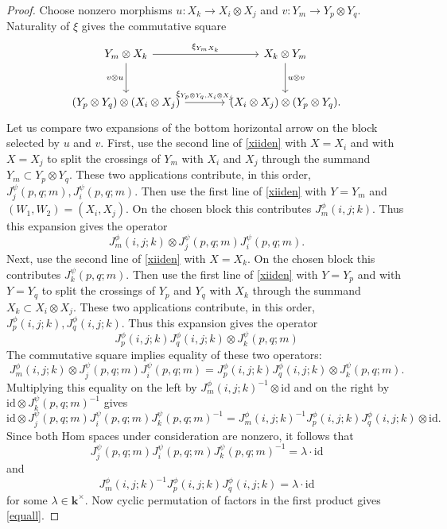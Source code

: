\documentclass[12pt]{amsart}
\numberwithin{equation}{section}
\theoremstyle{definition}
\newcommand{\id}{\text{id}}
\newcommand{\1}{_{(1)}}
\newcommand{\2}{_{(2)}}
\newcommand{\3}{_{(3)}}
\newcommand{\4}{_{(4)}}
\newcommand{\5}{_{(5)}}
\newcommand{\6}{_{(6)}}
\theoremstyle{plain}
\theoremstyle{definition}
\theoremstyle{remark}
\def\k{\mathbf{k}}
\begin{document}
\begin{proof}
Choose nonzero morphisms $u:X_k\to X_i\otimes X_j$ and $v:Y_m\to Y_p\otimes Y_q$.  Naturality of $\xi$ gives the commutative square
\[
\begin{tikzcd}[column sep=large,row sep=large]
Y_m\otimes X_k \arrow[r,"{\xi_{Y_mX_k}}"] \arrow[d,"{v\otimes u}"'] & X_k\otimes Y_m \arrow[d,"{u\otimes v}"] \\
(Y_p\otimes Y_q)\otimes (X_i\otimes X_j) \arrow[r,"{\xi_{Y_p\otimes Y_q, X_i\otimes X_j}}"] & (X_i\otimes X_j)\otimes (Y_p\otimes Y_q).
\end{tikzcd}
\]
Let us compare two expansions of the bottom horizontal arrow on the block selected by $u$ and $v$.
First, use the second line of \eqref{xiiden} with $X=X_i$ and with $X=X_j$ to split the crossings of $Y_m$ with $X_i$ and $X_j$ through the summand $Y_m\subset Y_p\otimes Y_q$.  These two applications contribute, in this order, $J^\psi_j(p,q;m), J^\psi_i(p,q;m)$. Then use the first line of \eqref{xiiden} with $Y=Y_m$ and $(W_1,W_2)=(X_i,X_j)$.  On the chosen block this contributes $J^\phi_m(i,j;k)$. 
Thus this expansion gives the operator
\[
        J^\phi_m(i,j;k)\otimes J^\psi_j(p,q;m)J^\psi_i(p,q;m).
\]
Next, use the second line of \eqref{xiiden} with $X=X_k$.  On the chosen block this contributes $J^\psi_k(p,q;m)$.  Then use the first line of \eqref{xiiden} with $Y=Y_p$ and with $Y=Y_q$ to split the crossings of $Y_p$ and $Y_q$ with $X_k$ through the summand $X_k\subset X_i\otimes X_j$.  These two applications contribute, in this order,
$J^\phi_p(i,j;k), J^\phi_q(i,j;k)$. Thus this expansion gives the operator
$$
        J^\phi_p(i,j;k)J^\phi_q(i,j;k)\otimes J^\psi_k(p,q;m)
$$
The commutative square implies equality of these two operators:
\[
        J^\phi_m(i,j;k)\otimes J^\psi_j(p,q;m)J^\psi_i(p,q;m)
        =
        J^\phi_p(i,j;k)J^\phi_q(i,j;k)\otimes J^\psi_k(p,q;m).
\]
Multiplying this equality on the left by $J^\phi_m(i,j;k)^{-1}\otimes\id$ and on the right by $\id\otimes J^\psi_k(p,q;m)^{-1}$ gives \scriptsize
$$
        \id\otimes J^\psi_j(p,q;m)J^\psi_i(p,q;m)J^\psi_k(p,q;m)^{-1}
        =J^\phi_m(i,j;k)^{-1}J^\phi_p(i,j;k)J^\phi_q(i,j;k)\otimes\id.
        $$ \normalsize
Since both Hom spaces under consideration are nonzero, it follows that
\[
J^\psi_j(p,q;m)J^\psi_i(p,q;m)J^\psi_k(p,q;m)^{-1}=\lambda\cdot\id
\]
and
\[
J^\phi_m(i,j;k)^{-1}J^\phi_p(i,j;k)J^\phi_q(i,j;k)=\lambda\cdot\id
\]
for some $\lambda\in \k^\times$.
Now cyclic permutation of factors in the first product gives \eqref{equall}.
\end{proof} 
\end{document}
